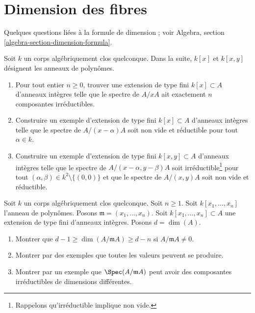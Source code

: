 \section{Dimension des fibres}
\label{section-dimension-fibres}

\noindent
Quelques questions liées à la formule de dimension ; voir
Algebra, section \ref{algebra-section-dimension-formula}.

\begin{exercise}
\label{exercise-nr-components-fibre}
Soit $k$ un corps algébriquement clos quelconque.
Dans la suite, $k[x]$ et $k[x, y]$ désignent les anneaux de polynômes.
\begin{enumerate}
\item Pour tout entier $n \geq 0$, trouver une extension de type fini
$k[x] \subset A$ d'anneaux intègres telle que le spectre de $A/xA$
ait exactement $n$ composantes irréductibles.
\item Construire un exemple d'extension de type fini $k[x] \subset A$
d'anneaux intègres telle que le spectre de $A/(x - \alpha)A$
soit non vide et réductible pour tout $\alpha \in k$.
\item Construire un exemple d'extension de type fini $k[x, y] \subset A$
d'anneaux intègres telle que le spectre de $A/(x - \alpha, y - \beta)A$
soit irréductible\footnote{Rappelons qu'irréductible implique non vide.}
pour tout $(\alpha, \beta) \in k^2 \setminus \{(0, 0)\}$
et que le spectre de $A/(x, y)A$ soit non vide et réductible.
\end{enumerate}
\end{exercise}

\begin{exercise}
\label{exercise-codim-1}
Soit $k$ un corps algébriquement clos quelconque.
Soit $n \geq 1$.
Soit $k[x_1, \ldots, x_n]$ l'anneau de polynômes.
Posons $\mathfrak m = (x_1, \ldots, x_n)$.
Soit $k[x_1, \ldots, x_n] \subset A$ une extension de type fini
d'anneaux intègres. Posons $d = \dim(A)$.
\begin{enumerate}
\item Montrer que $d - 1 \geq \dim(A/\mathfrak m A) \geq d - n$
si $A/\mathfrak mA \not = 0$.
\item Montrer par des exemples que toutes les valeurs peuvent se produire.
\item Montrer par un exemple que $\Spec(A/\mathfrak m A)$ peut
avoir des composantes irréductibles de dimensions différentes.
\end{enumerate}
\end{exercise}




